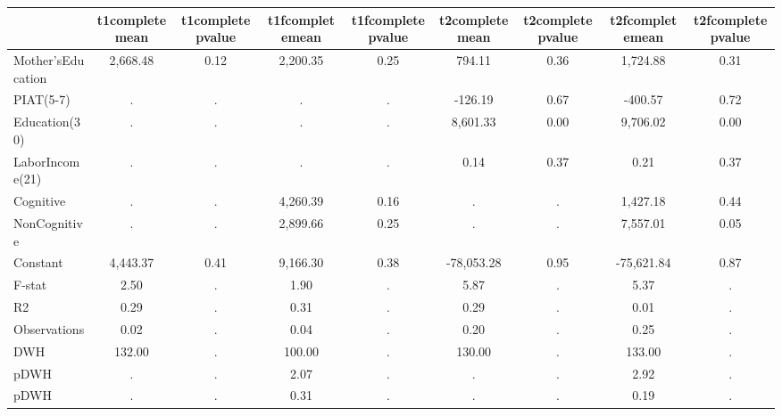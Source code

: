 \begin{table}[htbp]
\begin{tabular}{lcccccccc} \hline \hline
 & t1completemean  & t1completepvalue  & t1fcompletemean  & t1fcompletepvalue  & t2completemean  & t2completepvalue  & t2fcompletemean  & t2fcompletepvalue  \\  \hline 
Mother'sEducation &     2,668.48 &         0.12 &     2,200.35 &         0.25 &       794.11 &         0.36 &     1,724.88 &         0.31 \\  
PIAT(5-7) &            . &            . &            . &            . &      -126.19 &         0.67 &      -400.57 &         0.72 \\  
Education(30) &            . &            . &            . &            . &     8,601.33 &         0.00 &     9,706.02 &         0.00 \\  
LaborIncome(21) &            . &            . &            . &            . &         0.14 &         0.37 &         0.21 &         0.37 \\  
Cognitive &            . &            . &     4,260.39 &         0.16 &            . &            . &     1,427.18 &         0.44 \\  
NonCognitive &            . &            . &     2,899.66 &         0.25 &            . &            . &     7,557.01 &         0.05 \\  
Constant &     4,443.37 &         0.41 &     9,166.30 &         0.38 &   -78,053.28 &         0.95 &   -75,621.84 &         0.87 \\  
F-stat &         2.50 &            . &         1.90 &            . &         5.87 &            . &         5.37 &            . \\  
R2 &         0.29 &            . &         0.31 &            . &         0.29 &            . &         0.01 &            . \\  
Observations &         0.02 &            . &         0.04 &            . &         0.20 &            . &         0.25 &            . \\  
DWH &       132.00 &            . &       100.00 &            . &       130.00 &            . &       133.00 &            . \\  
pDWH &            . &            . &         2.07 &            . &            . &            . &         2.92 &            . \\  
pDWH &            . &            . &         0.31 &            . &            . &            . &         0.19 &            . \\  
\hline \hline \end{tabular}
\end{table}

